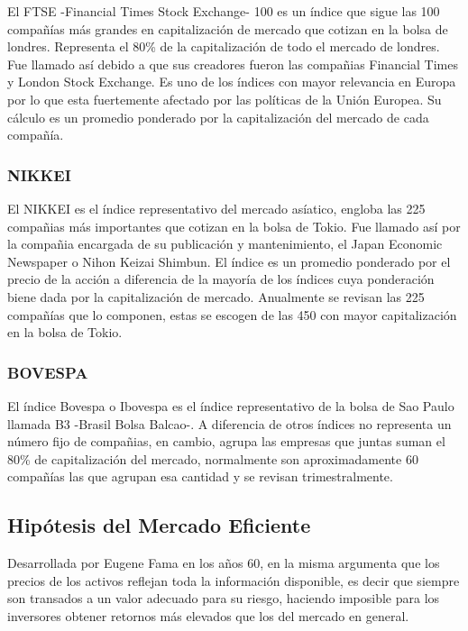 \documentclass[a4paper,12pt]{Latex/Classes/PhDthesisPSnPDF}
\begin{document}
El FTSE -Financial Times Stock Exchange- 100 es un índice que sigue las 100 compañías más grandes en capitalización de mercado que cotizan en la bolsa de londres. Representa el 80\% de la capitalización de todo el mercado de londres. Fue llamado así debido a que sus creadores fueron las compañias Financial Times y London Stock Exchange. Es uno de los índices con mayor relevancia en Europa por lo que esta fuertemente afectado por las políticas de la Unión Europea. Su cálculo es un promedio ponderado por la capitalización del mercado de cada compañía.

\subsubsection{NIKKEI}

El NIKKEI es el índice representativo del mercado asíatico, engloba las 225 compañias más importantes que cotizan en la bolsa de Tokio. Fue llamado así por la compañia encargada de su publicación y mantenimiento, el Japan Economic Newspaper o Nihon Keizai Shimbun. El índice es un promedio ponderado por el precio de la acción a diferencia de la mayoría de los índices cuya ponderación biene dada por la capitalización de mercado. Anualmente se revisan las 225 compañías que lo componen, estas se escogen de las 450 con mayor capitalización en la bolsa de Tokio.

\subsubsection{BOVESPA}

El índice Bovespa o Ibovespa es el índice representativo de la bolsa de Sao Paulo llamada B3 -Brasil Bolsa Balcao-. A diferencia de otros índices no representa un número fijo de compañias, en cambio, agrupa las empresas que juntas suman el 80\% de capitalización del mercado, normalmente son aproximadamente 60 compañías las que agrupan esa cantidad y se revisan trimestralmente.

\subsection{Hipótesis del Mercado Eficiente}

Desarrollada por Eugene Fama en los años 60, en la misma argumenta que los precios de los activos reflejan toda la información disponible, es decir que siempre son transados a un valor adecuado para su riesgo, haciendo imposible para los inversores obtener retornos más elevados que los del mercado en general. 
\end{document}
